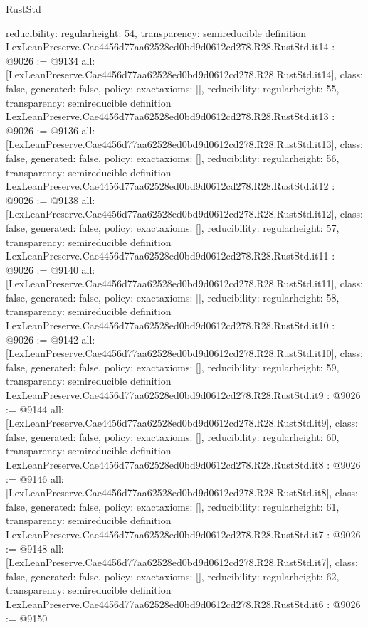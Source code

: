 \begin{lexlean}{RustStd}
\begin{coremodule}
{  reducibility: regular{height: 54},
  transparency: semireducible
}
definition LexLeanPreserve.Cae4456d77aa62528ed0bd9d0612cd278.R28.RustStd.it14 : @9026 := @9134 {
  all: [LexLeanPreserve.Cae4456d77aa62528ed0bd9d0612cd278.R28.RustStd.it14],
  class: false,
  generated: false,
  policy: exact{axioms: []},
  reducibility: regular{height: 55},
  transparency: semireducible
}
definition LexLeanPreserve.Cae4456d77aa62528ed0bd9d0612cd278.R28.RustStd.it13 : @9026 := @9136 {
  all: [LexLeanPreserve.Cae4456d77aa62528ed0bd9d0612cd278.R28.RustStd.it13],
  class: false,
  generated: false,
  policy: exact{axioms: []},
  reducibility: regular{height: 56},
  transparency: semireducible
}
definition LexLeanPreserve.Cae4456d77aa62528ed0bd9d0612cd278.R28.RustStd.it12 : @9026 := @9138 {
  all: [LexLeanPreserve.Cae4456d77aa62528ed0bd9d0612cd278.R28.RustStd.it12],
  class: false,
  generated: false,
  policy: exact{axioms: []},
  reducibility: regular{height: 57},
  transparency: semireducible
}
definition LexLeanPreserve.Cae4456d77aa62528ed0bd9d0612cd278.R28.RustStd.it11 : @9026 := @9140 {
  all: [LexLeanPreserve.Cae4456d77aa62528ed0bd9d0612cd278.R28.RustStd.it11],
  class: false,
  generated: false,
  policy: exact{axioms: []},
  reducibility: regular{height: 58},
  transparency: semireducible
}
definition LexLeanPreserve.Cae4456d77aa62528ed0bd9d0612cd278.R28.RustStd.it10 : @9026 := @9142 {
  all: [LexLeanPreserve.Cae4456d77aa62528ed0bd9d0612cd278.R28.RustStd.it10],
  class: false,
  generated: false,
  policy: exact{axioms: []},
  reducibility: regular{height: 59},
  transparency: semireducible
}
definition LexLeanPreserve.Cae4456d77aa62528ed0bd9d0612cd278.R28.RustStd.it9 : @9026 := @9144 {
  all: [LexLeanPreserve.Cae4456d77aa62528ed0bd9d0612cd278.R28.RustStd.it9],
  class: false,
  generated: false,
  policy: exact{axioms: []},
  reducibility: regular{height: 60},
  transparency: semireducible
}
definition LexLeanPreserve.Cae4456d77aa62528ed0bd9d0612cd278.R28.RustStd.it8 : @9026 := @9146 {
  all: [LexLeanPreserve.Cae4456d77aa62528ed0bd9d0612cd278.R28.RustStd.it8],
  class: false,
  generated: false,
  policy: exact{axioms: []},
  reducibility: regular{height: 61},
  transparency: semireducible
}
definition LexLeanPreserve.Cae4456d77aa62528ed0bd9d0612cd278.R28.RustStd.it7 : @9026 := @9148 {
  all: [LexLeanPreserve.Cae4456d77aa62528ed0bd9d0612cd278.R28.RustStd.it7],
  class: false,
  generated: false,
  policy: exact{axioms: []},
  reducibility: regular{height: 62},
  transparency: semireducible
}
definition LexLeanPreserve.Cae4456d77aa62528ed0bd9d0612cd278.R28.RustStd.it6 : @9026 := @9150 {
}
\end{coremodule}
\end{lexlean}
